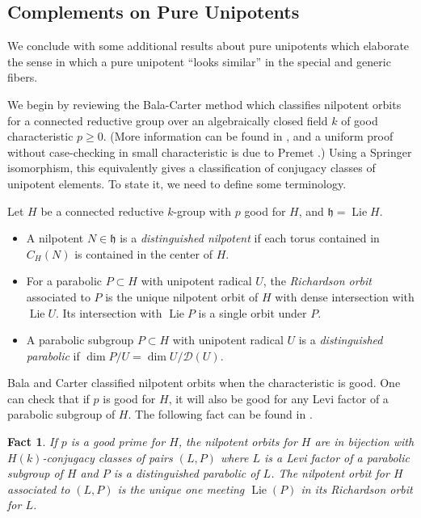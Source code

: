 \documentclass[11pt, letterpaper,english]{amsart}
\theoremstyle{plain}
\newtheorem{fact}[lem]{Fact}
\theoremstyle{definition}
\numberwithin{equation}{section}
\numberwithin{lem}{section}
\DeclareMathOperator{\Lie}{Lie}
\newcommand{\h}{\mathfrak{h}}
\begin{document}
\subsection{Complements on Pure Unipotents}

We conclude with some additional results about pure unipotents which elaborate the sense in which a pure unipotent ``looks similar'' in the special and generic fibers. 

We begin by reviewing the Bala-Carter method which classifies nilpotent orbits for a connected reductive group over an algebraically closed field $k$ of good characteristic $p \geq 0$.  (More information can be found in \cite[\S 4]{jantzen04}, and a uniform proof without case-checking in small characteristic is due to Premet \cite{premet03}.)  Using a Springer isomorphism, this equivalently gives a classification of conjugacy classes of unipotent elements.  To state it, we need to define some terminology.

Let $H$ be a connected reductive $k$-group with $p$ good for $H$, and $\h = \Lie H$.

\begin{itemize}
 \item A nilpotent $N \in \h$ is a \emph{distinguished nilpotent} if each torus contained in $C_{H}(N)$ is contained in the center of $H$.
 
 \item  For a parabolic $P \subset H$ with unipotent radical $U$, the \emph{Richardson orbit} associated to $P$ is the unique nilpotent orbit of $H$ with dense intersection with $\Lie U$.  Its intersection with $\Lie P$ is a single orbit under $P$.

 \item  A parabolic subgroup $P \subset H$ with unipotent radical $U$ is a \emph{distinguished parabolic} if $\dim P/U = \dim U/ \mathscr{D}(U)$.
\end{itemize}

Bala and Carter classified nilpotent orbits when the characteristic is good.  One can check that if $p$ is good for $H$, it will also be good for any Levi factor of a parabolic subgroup of $H$. The following fact can be found in \cite[\S 4]{jantzen04}.

\begin{fact} \label{fact:balacarter}
If $p$ is a good prime for $H$, the nilpotent orbits for $H$ are in bijection with $H(k)$-conjugacy classes of pairs $(L,P)$ where $L$ is a Levi factor of a parabolic subgroup of $H$ and $P$ is a distinguished parabolic of $L$.  The nilpotent orbit for $H$ associated to $(L,P)$ is the unique one meeting $\Lie(P)$ in its Richardson orbit for $L$.
\end{fact}
\end{document}
